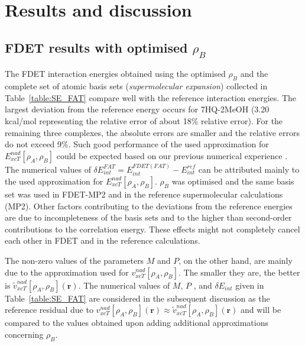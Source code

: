 \documentclass[amsmath,amssymb,preprint,aip,jcp]{revtex4-1}
\begin{document}
\section{Results and discussion}
\subsection{FDET results with optimised $\rho_B$}
The FDET interaction energies obtained using the optimised $\rho_B$ and the complete set of atomic basis sets ({\it supermolecular expansion}) collected in Table~\ref{table:SE_FAT} compare well with the reference interaction energies. 
The largest deviation from the reference energy occurs for 7HQ-2MeOH (3.20 kcal/mol representing the relative error of about 18\% relative error). 
For the remaining three complexes, the absolute errors are smaller and the relative errors do not exceed 9\%.
Such good performance of the used approximation for $E_{xcT}^{nad}[\rho_A,\rho_B]$
could be expected based on our previous numerical experience \cite{Wesolowski2003a,Kevorkyants2006,Dulak2007a,Sen2021}. The numerical values of $
\delta E_{int}^{FAT}=E^{FDET(FAT)}_{int}-E_{int}^{ref}\label{eq:def_err_en}$
 can be attributed mainly to the used approximation for $E_{xcT}^{nad}[\rho_A,\rho_B]$. 
 $\rho_B$ was optimised and the same basis set was used in FDET-MP2 and in the reference supermolecular calculations (MP2). 
Other factors contributing to the deviations from the reference energies are due to incompleteness of the basis sets and to the higher than second-order contributions to the correlation energy. These effects might not completely cancel each other in FDET and in the reference calculations. 

The non-zero values of the parameters $M$ and $P$, on the other hand, are mainly due to the approximation used for $v_{xcT}^{nad}[\rho_A,\rho_B]$. 
The smaller they are, the better is $\tilde{v}_{xcT}^{nad}[\rho_A,\rho_B](\mathbf{r})$.
The numerical values of $M$, $P$ , and $\delta E_{int}$ given in Table~\ref{table:SE_FAT} are considered in the subsequent discussion as the reference residual due to ${v}_{xcT}^{nad}[\rho_A,\rho_B](\mathbf{r})\approx\tilde{v}_{xcT}^{nad}[\rho_A,\rho_B](\mathbf{r})$ and will be compared to the values obtained upon adding additional approximations concerning $\rho_B$.
\end{document}
